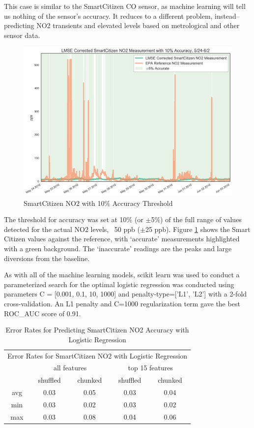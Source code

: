 This case is similar to the SmartCitizen CO sensor, as machine learning will tell us nothing of the sensor's accuracy.  It reduces to a different problem, instead-- predicting NO2 transients and elevated levels based on metrological and other sensor data. 

\begin{figure}[htb]
 	\includegraphics[width=\textwidth]{figs/sck_no2_with_10_accuracy_zoomed}               
 	 \caption{SmartCitizen NO2 with 10\% Accuracy Threshold}
  	\label{fig:sck_no2_with_10_accuracy_zoomed}
\end{figure}



The threshold for accuracy was set at 10\% (or $\pm$5\%) of the full range of values detected for the actual NO2 levels, ~50 ppb ($\pm$25 ppb).   Figure \ref{fig:sck_no2_with_10_accuracy_zoomed} shows the Smart Citizen values against the reference, with `accurate' measurements highlighted with a green background.  The `inaccurate' readings are the peaks and large diversions from the baseline.

As with all of the machine learning models, scikit learn was used to conduct a parameterized search for the optimal logistic regression was conducted using parameters C = [0.001, 0.1, 10, 1000] and penalty-type=['L1', 'L2'] with a 2-fold cross-validation.  An L1 penalty and C=1000 regularization term gave the best ROC\_AUC score of 0.91.  

\begin{table}[]
\centering
\begin{tabular}{|c|c|c|c|c|}
\toprule
\multicolumn{5}{|c|}{Error Rates for SmartCitizen NO2 with Logistic Regression} \\
&\multicolumn{2}{|c|}{all features} & \multicolumn{2}{|c|}{top 15 features} \\
&shuffled & chunked & shuffled & chunked \\
avg & 0.03 & 0.05 & 0.03 & 0.04 \\
min & 0.03 & 0.02 & 0.03 & 0.02 \\
max & 0.03 & 0.08 & 0.04 & 0.06 \\
\bottomrule
\end{tabular}
\label{tab:as1_co_error_rates}
\caption{Error Rates for Predicting SmartCitizen NO2 Accuracy with Logistic Regression}
\end{table}

